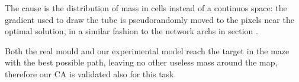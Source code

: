 \par
The cause is the distribution of mass in cells instead of a continuos space: the gradient used to draw the tube is pseudorandomly moved to the pixels near the optimal solution, in a similar fashion to the network archs in section .

\par
Both the real mould and our experimental model reach the target in the maze with the best possible path, leaving no other useless mass around the map, therefore our CA is validated also for this task.
